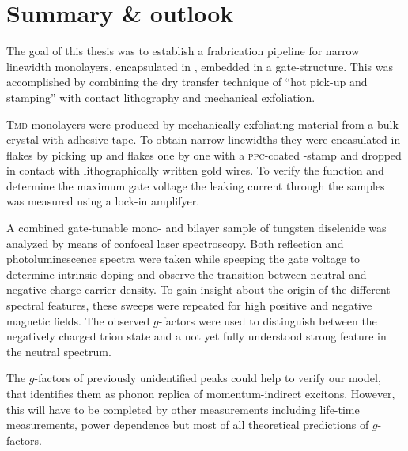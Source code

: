 \chapter{Summary \& outlook}

The goal of this thesis was to establish a frabrication pipeline for narrow linewidth \tmdg monolayers, encapsulated in \hbn, embedded in a gate-structure. This was accomplished by combining the dry transfer technique of ``hot pick-up and stamping'' with contact lithography and mechanical exfoliation.

\textsc{Tmd} monolayers were produced by mechanically exfoliating material from a bulk crystal with adhesive tape. To obtain narrow linewidths they were encasulated in \hbng flakes by picking up \hbng and \tmdg flakes one by one with a \textsc{ppc}-coated \pdms-stamp and dropped in contact with lithographically written gold wires. To verify the function and determine the maximum gate voltage the leaking current through the samples was measured using a lock-in amplifyer.

A combined gate-tunable mono- and bilayer sample of tungsten diselenide was analyzed by means of confocal laser spectroscopy. Both reflection and photoluminescence spectra were taken while speeping the gate voltage to determine intrinsic doping and observe the transition between neutral and negative charge carrier density. To gain insight about the origin of the different spectral features, these sweeps were repeated for high positive and negative magnetic fields. The observed $g$-factors were used to distinguish between the negatively charged trion state and a not yet fully understood strong feature in the neutral spectrum. 

The $g$-factors of previously unidentified peaks could help to verify our model, that identifies them as phonon replica of momentum-indirect excitons. However, this will have to be completed by other measurements including life-time measurements, power dependence but most of all theoretical predictions of $g$-factors. 